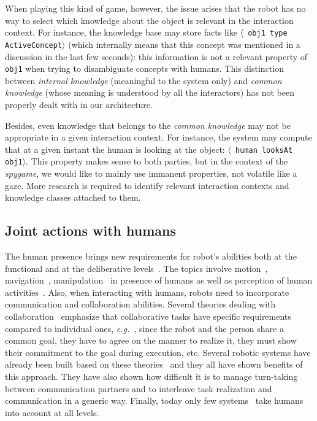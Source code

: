 \documentclass[preprint,3p,times]{elsarticle}
\newcommand{\concept}[1]{{\small \texttt{#1}}}
\newcommand{\stmt}[1]{{\footnotesize \tt $\langle$ #1\relax$\rangle$}}
\newcommand{\eg}{{\textit{e.g.\ }}}
\begin{document}
When playing this kind of game, however, the issue arises that the robot has no
way to select which knowledge about the object is relevant in the interaction
context. For instance, the knowledge base may store facts like \stmt{obj1 type
ActiveConcept} (which internally means that this concept was mentioned in a
discussion in the last few seconds): this information is not a relevant
property of \concept{obj1} when trying to disambiguate concepts with humans.
This distinction between \emph{internal knowledge} (meaningful to
the system only) and \emph{common knowledge} (whose meaning is understood by
all the interactors) has not been properly dealt with in our architecture.

Besides, even knowledge that belongs to the \emph{common knowledge} may not be
appropriate in a given interaction context. For instance, the system may
compute that at a given instant the human is looking at the object: \stmt{human
looksAt obj1}. This property makes sense to both parties, but in the context of
the \emph{spygame}, we would like to mainly use immanent properties, not
volatile like a gaze. More research is required to identify relevant
interaction contexts and knowledge classes attached to them.

\subsection{Joint actions with humans}
\label{sec:soa}

The human presence brings new requirements for robot's abilities both
at the functional and at the deliberative levels~\cite{Klein2004}. The
topics involve motion~\cite{Kulic2007,Berg2004,Madhava2006},
navigation~\cite{Althaus2004,Sisbot2007}, manipulation~\cite{Kemp2007}
in presence of humans as well as perception of human
activities~\cite{Breazeal2001,Burger2008}. Also, when
interacting with humans, robots need to incorporate communication and
collaboration abilities. Several theories dealing with
collaboration~\cite{Cohen1991,Grosz1996,Clark1996} emphasize that
collaborative tasks have specific requirements compared to individual
ones, \eg, since the robot and the person share a common goal, they
have to agree on the manner to realize it, they must show their
commitment to the goal during execution, etc. Several robotic systems
have already been built based on these
theories~\cite{Rich1997,Sidner2005,Breazeal2003} and they
all have shown benefits of this approach. They have also shown how
difficult it is to manage turn-taking between communication partners
and to interleave task realization and communication in a generic
way. Finally, today only few
systems~\cite{Fong2006,Breazeal2003,Sisbot2008} take humans into
account at all levels.
\end{document}
